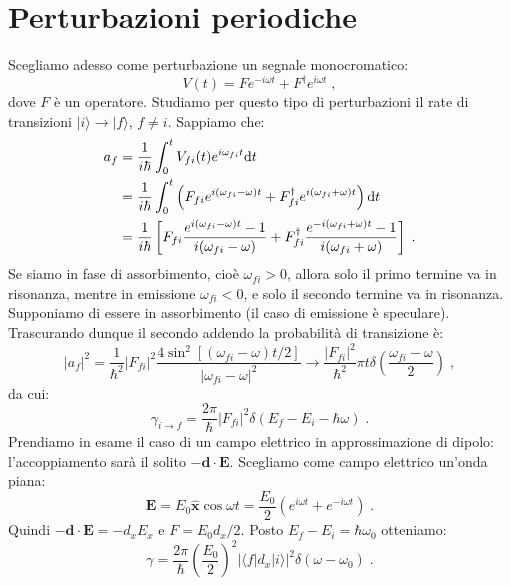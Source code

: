 \documentclass[12pt,a4paper]{report}
\theoremstyle{definition}
\numberwithin{equation}{section}
\newcommand{\diff}[1][]{\mathrm{d}#1}
\newcommand{\bra}{\langle}
\newcommand{\ket}{\rangle}
\newcommand{\adj}[1]{#1^{\dagger}}
\begin{document}
\section{Perturbazioni periodiche}
Scegliamo adesso come perturbazione un segnale monocromatico:
\begin{equation}
V(t)=Fe^{-i\omega t}+\adj{F}e^{i\omega t}\;,
\end{equation}
dove $F$ è un operatore. Studiamo per questo tipo di perturbazioni il rate di transizioni $|i\ket\to|f\ket$, $f\ne i$. Sappiamo che:
\begin{align}
a_f&=\frac{1}{i\hbar}\int_0^t V_{fi}(t)e^{i\omega_{fi}t}\diff{t} \notag \\
&=\frac{1}{i\hbar}\int_0^t\left(F_{fi}e^{i(\omega_{fi}-\omega)t}+\adj{F}_{fi}e^{i(\omega_{fi}+\omega)t}\right)\diff{t} \notag \\
&= \frac{1}{i\hbar}\left[ F_{fi}\frac{e^{i(\omega_{fi}-\omega)t}-1}{i(\omega_{fi}-\omega)}+\adj{F}_{fi}\frac{e^{-i(\omega_{fi}+\omega)t}-1}{i(\omega_{fi}+\omega)}\right]\;.
\end{align}
Se siamo in fase di assorbimento, cioè $\omega_{fi}>0$, allora solo il primo termine va in risonanza, mentre in emissione $\omega_{fi}<0$, e solo il secondo termine va in risonanza. Supponiamo di essere in assorbimento (il caso di emissione è speculare). Trascurando dunque il secondo addendo la probabilità di transizione è:
\begin{equation}
|a_f|^2=\frac{1}{\hbar^2}|F_{fi}|^2\frac{4\sin^2[(\omega_{fi}-\omega)t/2]}{|\omega_{fi}-\omega|^2} \longrightarrow \frac{|F_{fi}|^2}{\hbar^2}\pi t\delta\left(\frac{\omega_{fi}-\omega}{2}\right)\;,
\end{equation}
da cui:
\begin{equation}
\gamma_{i\to f}=\frac{2\pi}{\hbar}|F_{fi}|^2\delta(E_f-E_i-\hbar\omega)\;.
\end{equation}
Prendiamo in esame il caso di un campo elettrico in approssimazione di dipolo: l'accoppiamento sarà il solito $-\mathbf{d}\cdot\mathbf{E}$. Scegliamo come campo elettrico un'onda piana:
\begin{equation}
\mathbf{E}=E_0\hat{\mathbf{x}}\cos\omega t=\frac{E_0}{2}(e^{i\omega t}+e^{-i\omega t})\;.
\end{equation}
Quindi $-\mathbf{d}\cdot\mathbf{E}=-d_xE_x$ e $F=E_0d_x/2$. Posto $E_f-E_i=\hbar\omega_0$ otteniamo:
\begin{equation}
\gamma= \frac{2\pi}{\hbar}\left(\frac{E_0}{2}\right)^2|\bra f|d_x|i\ket|^2\delta(\omega-\omega_0)\;.
\end{equation}
\end{document}
